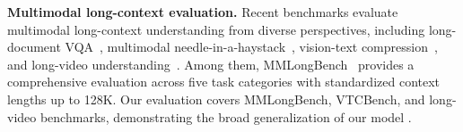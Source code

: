\noindent\textbf{Multimodal long-context evaluation.}
Recent benchmarks evaluate multimodal long-context understanding from diverse perspectives, including long-document VQA~\citep{ma2024mmlongbenchdoc,deng2025longdocurl}, multimodal needle-in-a-haystack~\citep{wang2024multimodal,wu2024visual}, vision-text compression~\citep{zhao2025vtcbench}, and long-video understanding~\citep{fu2025video,zhou2025mlvu,wang2025lvbench}.
Among them, MMLongBench~\citep{wang2025mmlongbench} provides a comprehensive evaluation across five task categories with standardized context lengths up to 128K.
Our evaluation covers MMLongBench, VTCBench, and long-video benchmarks, demonstrating the broad generalization of our model \modelname.
